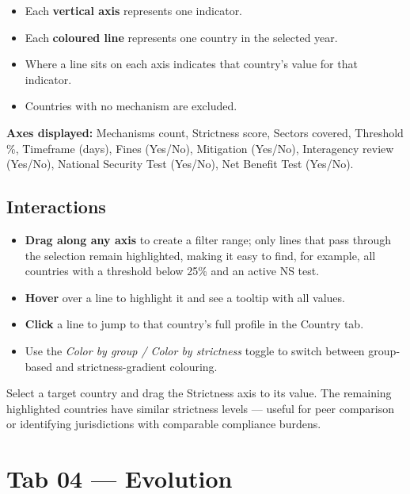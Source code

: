 \documentclass[12pt,a4paper]{article}
\newcommand{\uielem}[1]{\textit{#1}}
\begin{document}
\begin{itemize}
  \item Each \textbf{vertical axis} represents one indicator.
  \item Each \textbf{coloured line} represents one country in the selected year.
  \item Where a line sits on each axis indicates that country's value for that indicator.
  \item Countries with no mechanism are excluded.
\end{itemize}

\textbf{Axes displayed:}
Mechanisms count, Strictness score, Sectors covered, Threshold \%, Timeframe (days), Fines (Yes/No), Mitigation (Yes/No), Interagency review (Yes/No), National Security Test (Yes/No), Net Benefit Test (Yes/No).

\subsection{Interactions}

\begin{itemize}
  \item \textbf{Drag along any axis} to create a filter range; only lines that pass through the selection remain highlighted, making it easy to find, for example, all countries with a threshold below 25\% and an active NS test.
  \item \textbf{Hover} over a line to highlight it and see a tooltip with all values.
  \item \textbf{Click} a line to jump to that country's full profile in the Country tab.
  \item Use the \uielem{Color by group / Color by strictness} toggle to switch between group-based and strictness-gradient colouring.
\end{itemize}

\begin{tipbox}
Select a target country and drag the Strictness axis to its value. The remaining highlighted countries have similar strictness levels — useful for peer comparison or identifying jurisdictions with comparable compliance burdens.
\end{tipbox}

\section{Tab 04 — Evolution}
\label{sec:evolution}
\end{document}
